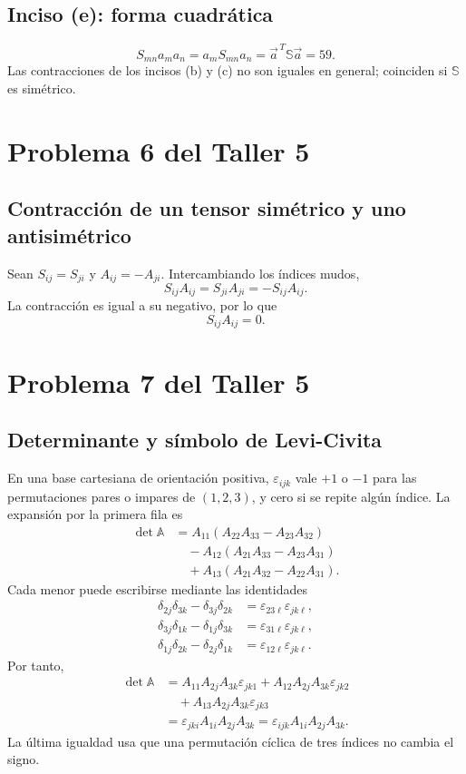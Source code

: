 \subsection*{Inciso (e): forma cuadrática}
\[
S_{mn}a_ma_n=a_mS_{mn}a_n
=\vec a^{\,T}\mathbb S\vec a=\boxed{59}.
\]
Las contracciones de los incisos (b) y (c) no son iguales en general; coinciden si $\mathbb S$ es simétrico.

\section{Problema 6 del Taller 5}

\subsection{Contracción de un tensor simétrico y uno antisimétrico}

Sean $S_{ij}=S_{ji}$ y $A_{ij}=-A_{ji}$. Intercambiando los índices mudos,
\[
S_{ij}A_{ij}=S_{ji}A_{ji}
=-S_{ij}A_{ij}.
\]
La contracción es igual a su negativo, por lo que
\[
\boxed{S_{ij}A_{ij}=0}.
\]

\section{Problema 7 del Taller 5}

\subsection{Determinante y símbolo de Levi-Civita}

En una base cartesiana de orientación positiva, $\varepsilon_{ijk}$ vale $+1$ o $-1$ para las permutaciones pares o impares de $(1,2,3)$, y cero si se repite algún índice. La expansión por la primera fila es
\[
\begin{aligned}
\det\mathbb A
&=A_{11}(A_{22}A_{33}-A_{23}A_{32})\\
&\quad-A_{12}(A_{21}A_{33}-A_{23}A_{31})\\
&\quad+A_{13}(A_{21}A_{32}-A_{22}A_{31}).
\end{aligned}
\]
Cada menor puede escribirse mediante las identidades
\[
\begin{aligned}
\delta_{2j}\delta_{3k}-\delta_{3j}\delta_{2k}
&=\varepsilon_{23\ell}\varepsilon_{jk\ell},\\
\delta_{3j}\delta_{1k}-\delta_{1j}\delta_{3k}
&=\varepsilon_{31\ell}\varepsilon_{jk\ell},\\
\delta_{1j}\delta_{2k}-\delta_{2j}\delta_{1k}
&=\varepsilon_{12\ell}\varepsilon_{jk\ell}.
\end{aligned}
\]
Por tanto,
\[
\begin{aligned}
\det\mathbb A
&=A_{11}A_{2j}A_{3k}\varepsilon_{jk1}
+A_{12}A_{2j}A_{3k}\varepsilon_{jk2}\\
&\quad+A_{13}A_{2j}A_{3k}\varepsilon_{jk3}\\
&=\varepsilon_{jki}A_{1i}A_{2j}A_{3k}
=\boxed{\varepsilon_{ijk}A_{1i}A_{2j}A_{3k}}.
\end{aligned}
\]
La última igualdad usa que una permutación cíclica de tres índices no cambia el signo.

